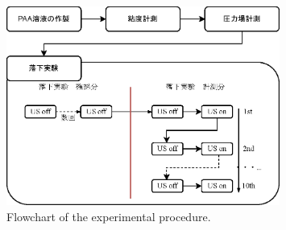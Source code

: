 \begin{figure}[ht]
    \centering
    \includegraphics[width=0.8\textwidth]{2-Methods/exp-methods.eps}
    \caption{Flowchart of the experimental procedure.}
    \label{fig:exp-methods}
\end{figure}
